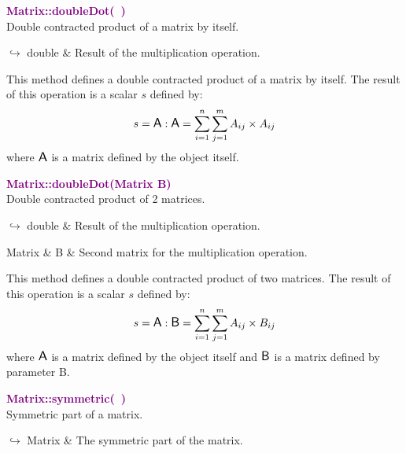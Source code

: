 \textcolor{purple}{\textbf{Matrix::doubleDot(~)}}\label{Matrix::doubleDot()}\\
Double contracted product of a matrix by itself.\vspace*{-0.5em}
\begin{tcolorbox}[grow to left by=-1cm, width=\textwidth-1cm,myArgs,tabularx={l|R}]
$\hookrightarrow$ double & Result of the multiplication operation.
\end{tcolorbox}

This method defines a double contracted product of a matrix by itself.
The result of this operation is a scalar $s$ defined by:
\begin{equation*}
s = \mbox{\large\ensuremath{\mathsf{A}}} : \mbox{\large\ensuremath{\mathsf{A}}} = \sum_{i=1}^{n} \sum_{j=1}^{m} A_{ij}\times A_{ij}
\end{equation*}
where $\mbox{\large\ensuremath{\mathsf{A}}}$ is a matrix defined by the object itself.

\textcolor{purple}{\textbf{Matrix::doubleDot(Matrix B)}}\label{Matrix::doubleDot(Matrix B)}\\
Double contracted product of 2 matrices.\vspace*{-0.5em}
\begin{tcolorbox}[grow to left by=-1cm, width=\textwidth-1cm,myArgs,tabularx={l|R}]
$\hookrightarrow$ double & Result of the multiplication operation.
\end{tcolorbox}

\begin{tcolorbox}[width=\textwidth,myArgs,tabularx={ll|R}]
Matrix & B & Second matrix for the multiplication operation.
\end{tcolorbox}

This method defines a double contracted product of two matrices.
The result of this operation is a scalar $s$ defined by:
\begin{equation*}
s = \mbox{\large\ensuremath{\mathsf{A}}} : \mbox{\large\ensuremath{\mathsf{B}}} = \sum_{i=1}^{n} \sum_{j=1}^{m} A_{ij}\times B_{ij}
\end{equation*}
where $\mbox{\large\ensuremath{\mathsf{A}}}$ is a matrix defined by the object itself and $\mbox{\large\ensuremath{\mathsf{B}}}$ is a matrix defined by parameter B.

\textcolor{purple}{\textbf{Matrix::symmetric(~)}}\label{Matrix::symmetric()}\\
Symmetric part of a matrix.\vspace*{-0.5em}
\begin{tcolorbox}[grow to left by=-1cm, width=\textwidth-1cm,myArgs,tabularx={l|R}]
$\hookrightarrow$ Matrix & The symmetric part of the matrix.
\end{tcolorbox}

